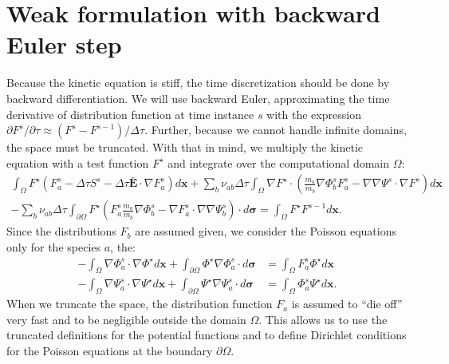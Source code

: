 \documentclass[reprint]{revtex4}
\begin{document}
\section{Weak formulation with backward Euler step}
Because the kinetic equation is stiff, the time discretization should be done by backward differentiation. We will use backward Euler, approximating the time derivative of distribution function at time instance $s$ with the expression $\partial F^{s}/\partial\tau\approx (F^{s}-F^{s-1})/\Delta \tau$. Further, because we cannot handle infinite domains, the space must be truncated. With that in mind, we multiply the kinetic equation with a test function $F^{\star}$ and integrate over the computational domain $\Omega$:
\begin{multline}
\int_{\Omega}F^{\star}\left(F_a^s -\Delta\tau S^s-\Delta\tau\bar{\bm{E}}\cdot\nabla F_a^s\right)d\bm{x}
+\sum_b\nu_{ab}\Delta\tau\int_{\Omega}\nabla F^{\star}\cdot\left(\frac{m_a}{m_b}\nabla \Phi_b^s F_a^s-\nabla\nabla\Psi^s\cdot\nabla F^s\right)d\bm{x}\\
-\sum_b\nu_{ab}\Delta\tau\int_{\partial\Omega}F^{\star}\left(F_a^s\frac{m_a}{m_b}\nabla\Phi_b^s-\nabla F_a^s\cdot\nabla\nabla\Psi_b^s\right)\cdot d\bm{\sigma}
=\int_{\Omega}F^{\star}F^{s-1}d\bm{x}.
\end{multline}
Since the distributions $F_b$ are assumed given, we consider the Poisson equations only for the species $a$, the:
\begin{align}
-\int_{\Omega}\nabla\Phi_a^s\cdot\nabla\Phi^{\star}d\bm{x}+\int_{\partial\Omega}\Phi^{\star}\nabla\Phi_a^s\cdot d\bm{\sigma}&=\int_{\Omega}F_a^s\Phi^{\star}d\bm{x}\\
-\int_{\Omega}\nabla\Psi_a^s\cdot\nabla\Psi^{\star}d\bm{x}+\int_{\partial\Omega}\Psi^{\star}\nabla\Psi_a^s\cdot d\bm{\sigma}&=\int_{\Omega}\Phi_a^s\Psi^{\star}d\bm{x}.
\end{align}
When we truncate the space, the distribution function $F_a$ is assumed to ``die off'' very fast and to be negligible outside the domain $\Omega$. This allows us to use the truncated definitions for the potential functions and to define Dirichlet conditions for the Poisson equations at the boundary $\partial\Omega$. 
\end{document}
